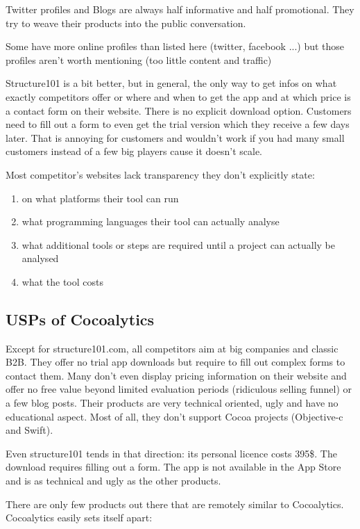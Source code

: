 \documentclass{article}
\begin{document}
Twitter profiles and Blogs are always half informative and half promotional. They try to weave their products into the public conversation.

Some have more online profiles than listed here (twitter, facebook ...) but those profiles aren't worth mentioning (too little content and traffic)

Structure101 is a bit better, but in general, the only way to get infos on what exactly competitors offer or where and when to get the app and at which price is a contact form on their website. There is no explicit download option. Customers need to fill out a form to even get the trial version which they receive a few days later. That is annoying for customers and wouldn't work if you had many small customers instead of a few big players cause it doesn't scale.

Most competitor's websites lack transparency they don't explicitly state:
\begin{enumerate}
	\item on what platforms their tool can run
	\item what programming languages their tool can actually analyse
	\item what additional tools or steps are required until a project can actually be analysed
	\item what the tool costs
\end{enumerate}

\subsection{USPs of Cocoalytics}

Except for structure101.com, all competitors aim at big companies and classic B2B. They offer no trial app downloads but require to fill out complex forms to contact them. Many don't even display pricing information on their website and offer no free value beyond limited evaluation periods (ridiculous selling funnel) or a few blog posts. Their products are very technical oriented, ugly and have no educational aspect. Most of all, they don't support Cocoa projects (Objective-c and Swift).

Even structure101 tends in that direction: its personal licence costs 395\$. The download requires filling out a form. The app is not available in the App Store and is as technical and ugly as the other products.

There are only few products out there that are remotely similar to Cocoalytics. Cocoalytics easily sets itself apart:
\end{document}
